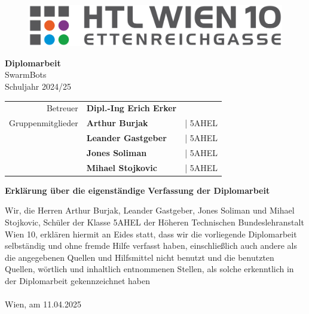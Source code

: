 \documentclass[12pt]{article}
\begin{document}
	\pagestyle{fancy}
	\fancyhf{}
	
	
	\begin{titlepage}
		\centering
		\Huge
		\begin{figure}[H]
			\includegraphics[width=1\textwidth, center]{img/HTL_Logo.png}
		\end{figure}
		\textbf{Diplomarbeit} \\
		\vspace{5mm}
		\huge
		SwarmBots \\ 
		\vspace{5mm} 
		Schuljahr 2024/25 \\
		\vspace{2cm}
		\Large
		\begin{tabular}{r @{: } >{\bfseries} l r}
			\vspace{3mm}
			Betreuer & Dipl.-Ing Erich Erker\\
			Gruppenmitglieder & Arthur Burjak & | 5AHEL\\
			& Leander Gastgeber & | 5AHEL\\
			& Jones Soliman & | 5AHEL\\
			& Mihael Stojkovic & | 5AHEL 
	\end{tabular}
	\end{titlepage}
	\newpage
	\centering
	\LARGE
	\textbf{Erklärung über die eigenständige Verfassung der Diplomarbeit}

	\justify 
	\Large
	Wir, die Herren Arthur Burjak, Leander Gastgeber, Jones Soliman und Mihael Stojkovic, Schüler
	der Klasse 5AHEL der Höheren Technischen Bundeslehranstalt Wien 10, erklären hiermit an
	Eides statt, dass wir die vorliegende Diplomarbeit selbständig und ohne fremde Hilfe verfasst
	haben, einschließlich auch andere als die angegebenen Quellen und Hilfsmittel nicht benutzt
	und die benutzten Quellen, wörtlich und inhaltlich entnommenen Stellen, als solche
	erkenntlich in der Diplomarbeit gekennzeichnet haben
	\\
	\vspace{5mm}
	\\
	Wien, am 11.04.2025
	\vspace{8mm} \\
\end{document}

